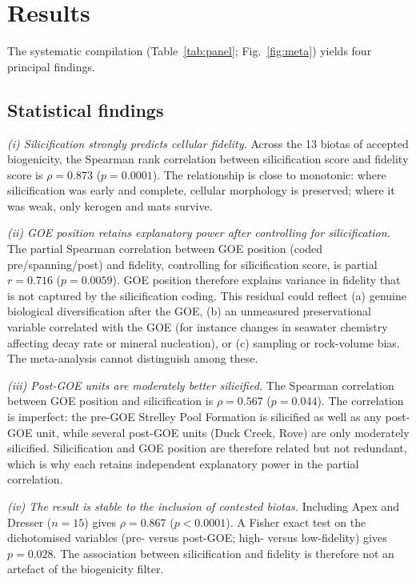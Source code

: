 \documentclass[11pt]{article}
\begin{document}
\section{Results}

The systematic compilation (Table~\ref{tab:panel}; Fig.~\ref{fig:meta}) yields four principal
findings.

\subsection{Statistical findings}

\textit{(i) Silicification strongly predicts cellular fidelity.} Across the 13 biotas of accepted
biogenicity, the Spearman rank correlation between silicification score and fidelity score is
$\rho = 0.873$ ($p = 0.0001$). The relationship is close to monotonic: where silicification was
early and complete, cellular morphology is preserved; where it was weak, only kerogen and mats
survive.

\textit{(ii) GOE position retains explanatory power after controlling for silicification.} The
partial Spearman correlation between GOE position (coded pre/spanning/post) and fidelity,
controlling for silicification score, is partial $r = 0.716$ ($p = 0.0059$). GOE position therefore
explains variance in fidelity that is not captured by the silicification coding. This residual could
reflect (a) genuine biological diversification after the GOE, (b) an unmeasured preservational
variable correlated with the GOE (for instance changes in seawater chemistry affecting decay rate or
mineral nucleation), or (c) sampling or rock-volume bias. The meta-analysis cannot distinguish among
these.

\textit{(iii) Post-GOE units are moderately better silicified.} The Spearman correlation between GOE
position and silicification is $\rho = 0.567$ ($p = 0.044$). The correlation is imperfect: the
pre-GOE Strelley Pool Formation is silicified as well as any post-GOE unit, while several post-GOE
units (Duck Creek, Rove) are only moderately silicified. Silicification and GOE position are
therefore related but not redundant, which is why each retains independent explanatory power in the
partial correlation.

\textit{(iv) The result is stable to the inclusion of contested biotas.} Including Apex and Dresser
($n = 15$) gives $\rho = 0.867$ ($p < 0.0001$). A Fisher exact test on the dichotomised variables
(pre- versus post-GOE; high- versus low-fidelity) gives $p = 0.028$. The association between
silicification and fidelity is therefore not an artefact of the biogenicity filter.
\end{document}
